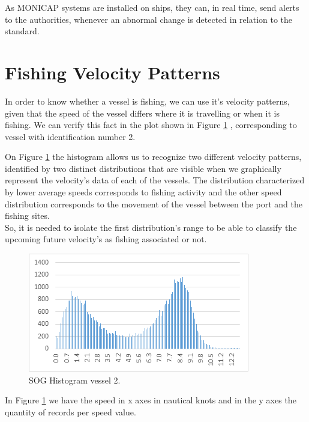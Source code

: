 As MONICAP systems are installed on ships, they can, in real time, send alerts to the authorities, whenever an abnormal change is detected in relation to the standard.


\section{Fishing Velocity Patterns} %
\label{sub:fishing_velocity_patterns}
In order to know whether a vessel is fishing, we can use it’s velocity patterns, given that the speed of the vessel differs where it is travelling or when it is fishing. We can verify this fact in the plot shown in Figure \ref{fig:histogram_vessel2} , corresponding to vessel with identification number 2.

On Figure \ref{fig:histogram_vessel2} the histogram allows us to recognize two different velocity patterns, identified by two distinct distributions that are visible when we graphically represent the velocity’s data of each of the vessels. The distribution characterized by lower average speeds corresponds to fishing activity and the other speed distribution corresponds to the movement of the vessel between the port and the fishing sites.\\
So, it is needed to isolate the first distribution’s range to be able to classify the upcoming future velocity’s as fishing associated or not.
 
\begin{figure}[H]
    \centering
    \includegraphics[width=0.8\linewidth]{Chapters/img/hist_vessel2.png}
    \caption{SOG Histogram vessel 2.}
    \label{fig:histogram_vessel2}
\end{figure}

In Figure \ref{fig:histogram_vessel2} we have the speed in x axes in nautical knots and in the y axes the quantity of records per speed value.


